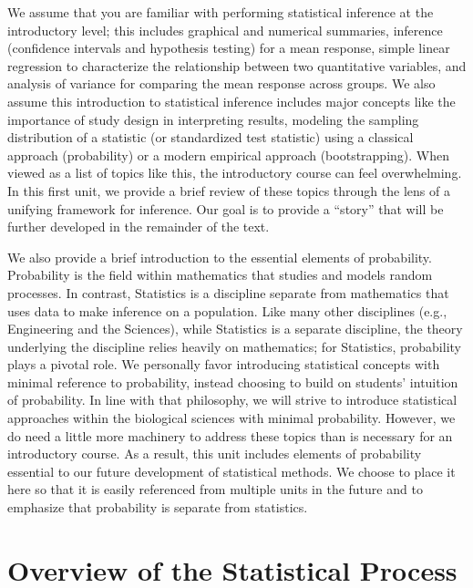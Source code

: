 \documentclass[
  letterpaper,
  DIV=11,
  numbers=noendperiod]{scrreprt}
\theoremstyle{definition}
\theoremstyle{definition}
\theoremstyle{remark}
\begin{document}
We assume that you are familiar with performing statistical inference at
the introductory level; this includes graphical and numerical summaries,
inference (confidence intervals and hypothesis testing) for a mean
response, simple linear regression to characterize the relationship
between two quantitative variables, and analysis of variance for
comparing the mean response across groups. We also assume this
introduction to statistical inference includes major concepts like the
importance of study design in interpreting results, modeling the
sampling distribution of a statistic (or standardized test statistic)
using a classical approach (probability) or a modern empirical approach
(bootstrapping). When viewed as a list of topics like this, the
introductory course can feel overwhelming. In this first unit, we
provide a brief review of these topics through the lens of a unifying
framework for inference. Our goal is to provide a ``story'' that will be
further developed in the remainder of the text.

We also provide a brief introduction to the essential elements of
probability. Probability is the field within mathematics that studies
and models random processes. In contrast, Statistics is a discipline
separate from mathematics that uses data to make inference on a
population. Like many other disciplines (e.g., Engineering and the
Sciences), while Statistics is a separate discipline, the theory
underlying the discipline relies heavily on mathematics; for Statistics,
probability plays a pivotal role. We personally favor introducing
statistical concepts with minimal reference to probability, instead
choosing to build on students' intuition of probability. In line with
that philosophy, we will strive to introduce statistical approaches
within the biological sciences with minimal probability. However, we do
need a little more machinery to address these topics than is necessary
for an introductory course. As a result, this unit includes elements of
probability essential to our future development of statistical methods.
We choose to place it here so that it is easily referenced from multiple
units in the future and to emphasize that probability is separate from
statistics.

\hypertarget{sec-statistical-process}{%
\chapter{Overview of the Statistical
Process}\label{sec-statistical-process}}

\providecommand{\norm}[1]{\lVert#1\rVert}
\providecommand{\abs}[1]{\lvert#1\rvert}
\providecommand{\dist}[1]{\stackrel{\text{#1}}{\sim}}
\providecommand{\ind}[1]{\mathbb{I}\left(#1\right)}
\providecommand{\bm}[1]{\mathbf{#1}}
\providecommand{\bs}[1]{\boldsymbol{#1}}
\providecommand{\Ell}{\mathcal{L}}
\providecommand{\indep}{\perp\negthickspace\negmedspace\perp}
\end{document}
